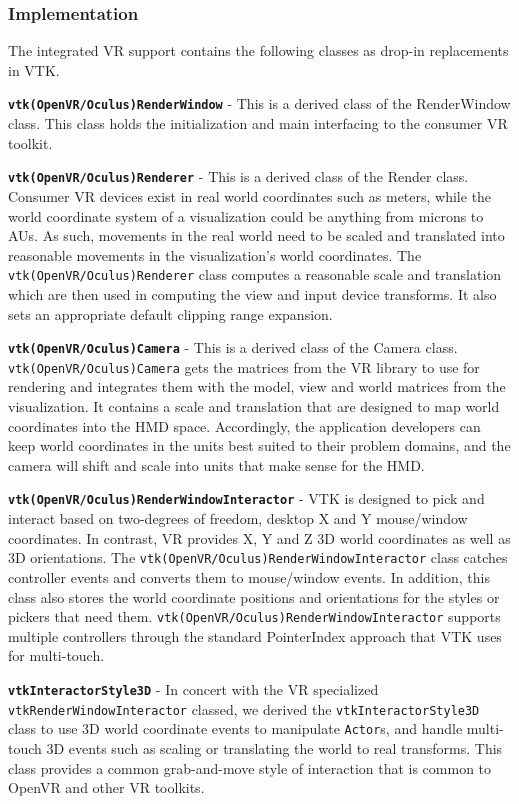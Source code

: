 \subsubsection{Implementation}

The integrated VR support contains the following classes as drop-in replacements in VTK.

\textbf{\texttt{vtk(OpenVR/Oculus)RenderWindow}} - This is a derived class of the RenderWindow class.
This class holds the initialization and main interfacing to the consumer VR toolkit. 

\textbf{\texttt{vtk(OpenVR/Oculus)Renderer}} - This is a derived class of the Render class.
Consumer VR devices exist in real world coordinates such as meters, while the world coordinate system of a visualization could be anything from microns to AUs. As such, movements in the real world need to be scaled and translated into reasonable movements in the visualization's world coordinates. The \texttt{vtk(OpenVR/Oculus)Renderer} class computes a reasonable scale and translation which are then used in computing the view and input device transforms. 
It also sets an appropriate default clipping range expansion.

\textbf{\texttt{vtk(OpenVR/Oculus)Camera}} - This is a derived class of the Camera class. \texttt{vtk(OpenVR/Oculus)Camera} gets the matrices from the VR library to use for rendering and integrates them with the model, view and world matrices from the visualization. It contains a scale and translation that are designed to map world coordinates into the HMD space.
Accordingly, the application developers can keep world coordinates in the units best suited to their problem domains, and the camera will shift and scale into units that make sense for the HMD.

\textbf{\texttt{vtk(OpenVR/Oculus)RenderWindowInteractor}} - VTK is designed to pick and interact based on two-degrees of freedom, desktop X and Y mouse/window coordinates.
In contrast, VR provides X, Y and Z 3D world coordinates as well as 3D orientations.
The \texttt{vtk(OpenVR/Oculus)RenderWindowInteractor} class catches controller events and converts them to mouse/window events.
In addition, this class also stores the world coordinate positions and orientations for the styles or pickers that need them.
\texttt{vtk(OpenVR/Oculus)RenderWindowInteractor} supports multiple controllers through the standard PointerIndex approach that VTK uses for multi-touch.

\textbf{\texttt{vtkInteractorStyle3D}} - In concert with the VR specialized \texttt{vtkRenderWindowInteractor} classed, we derived the \texttt{vtkInteractorStyle3D} class
to use 3D world coordinate events to manipulate \texttt{Actor}s, and handle multi-touch 3D events such as scaling or translating the world to real transforms.
This class provides a common grab-and-move style of interaction that is common to OpenVR and other VR toolkits.

